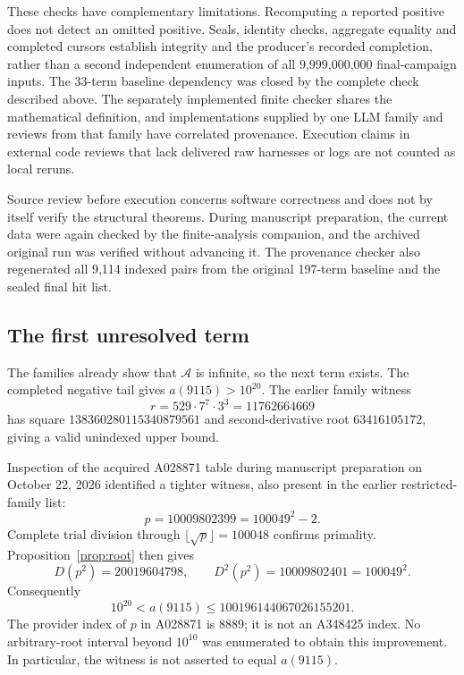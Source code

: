 \documentclass[11pt]{article}
\theoremstyle{definition}
\theoremstyle{remark}
\newcommand{\DD}{D^{2}}
\begin{document}
These checks have complementary limitations. Recomputing a reported
positive does not detect an omitted positive. Seals, identity checks,
aggregate equality and completed cursors establish integrity and the
producer's recorded completion, rather than a second independent
enumeration of all 9,999,000,000 final-campaign inputs. The 33-term
baseline dependency was closed by the complete check described above.
The separately
implemented finite checker shares the mathematical definition, and
implementations supplied by one LLM family and reviews from that
family have correlated provenance. Execution claims in external code reviews that
lack delivered raw harnesses or logs are not counted as local reruns.

Source review before execution concerns software correctness and
does not by itself verify the structural theorems. During manuscript
preparation, the current data were
again checked by the finite-analysis companion, and the archived
original run was verified without advancing it. The provenance
checker also regenerated all 9,114 indexed pairs from the original
197-term baseline and the sealed final hit list.

\subsection{The first unresolved term}\label{sec:bound}
The families already show that $\mathcal A$ is infinite, so the next
term exists. The completed negative tail gives $a(9115)>10^{20}$.
The earlier family witness
\[
 r=529\cdot7^{7}\cdot3^{3}=11762664669
\]
has square $138360280115340879561$ and second-derivative root
$63416105172$, giving a valid unindexed upper bound.

Inspection of the acquired A028871 table \cite{near2} during manuscript
preparation on October 22, 2026 identified a tighter witness, also
present in the earlier restricted-family list:
\[
 p=10009802399=100049^{2}-2.
\]
Complete trial division through $\lfloor\sqrt p\rfloor=100048$
confirms primality. Proposition~\ref{prop:root} then gives
\[
 D(p^{2})=20019604798,\qquad \DD(p^{2})=10009802401=100049^{2}.
\]
Consequently
\begin{equation}\label{eq:bound}
 10^{20}<a(9115)\leq100196144067026155201.
\end{equation}
The provider index of $p$ in A028871 is 8889; it is not an A348425
index. No arbitrary-root interval beyond $10^{10}$ was enumerated
to obtain this improvement. In particular, the witness is not asserted
to equal $a(9115)$.
\end{document}
